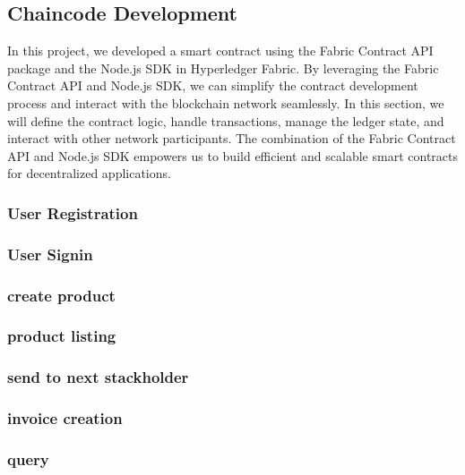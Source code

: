 \subsection{Chaincode Development}
\noindent In this project, we developed a smart 
contract using the Fabric Contract API package and the Node.js SDK in Hyperledger Fabric. By leveraging the Fabric Contract API and Node.js SDK, we can simplify the contract development process and interact with the blockchain network seamlessly. In this section, we will define the contract logic, handle transactions, manage the ledger state, and interact with other network participants. The combination of the Fabric Contract API and Node.js SDK empowers us to build efficient and scalable smart contracts for decentralized applications.
\subsubsection{User Registration}

\subsubsection{User Signin}

\subsubsection{create product}

\subsubsection{product listing}

\subsubsection{send to next stackholder}

\subsubsection{invoice creation}

\subsubsection{query}

